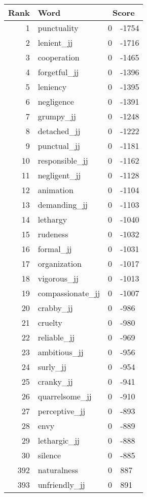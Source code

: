 \begin{longtable}[!htbp]{| rlr@{.}l |}
    \hline
    \textbf{Rank} & \textbf{Word} & \multicolumn{2}{c|}{\textbf{Score}} \\
    \hline
    \endhead
    1 & punctuality & 0 & -1754 \\
    2 & lenient\_jj & 0 & -1716 \\
    3 & cooperation & 0 & -1465 \\
    4 & forgetful\_jj & 0 & -1396 \\
    5 & leniency & 0 & -1395 \\
    6 & negligence & 0 & -1391 \\
    7 & grumpy\_jj & 0 & -1248 \\
    8 & detached\_jj & 0 & -1222 \\
    9 & punctual\_jj & 0 & -1181 \\
    10 & responsible\_jj & 0 & -1162 \\
    11 & negligent\_jj & 0 & -1128 \\
    12 & animation & 0 & -1104 \\
    13 & demanding\_jj & 0 & -1103 \\
    14 & lethargy & 0 & -1040 \\
    15 & rudeness & 0 & -1032 \\
    16 & formal\_jj & 0 & -1031 \\
    17 & organization & 0 & -1017 \\
    18 & vigorous\_jj & 0 & -1013 \\
    19 & compassionate\_jj & 0 & -1007 \\
    20 & crabby\_jj & 0 & -986 \\
    21 & cruelty & 0 & -980 \\
    22 & reliable\_jj & 0 & -969 \\
    23 & ambitious\_jj & 0 & -956 \\
    24 & surly\_jj & 0 & -954 \\
    25 & cranky\_jj & 0 & -941 \\
    26 & quarrelsome\_jj & 0 & -910 \\
    27 & perceptive\_jj & 0 & -893 \\
    28 & envy & 0 & -889 \\
    29 & lethargic\_jj & 0 & -888 \\
    30 & silence & 0 & -885 \\
    392 & naturalness & 0 & 887 \\
    393 & unfriendly\_jj & 0 & 891 \\

\end{longtable}
